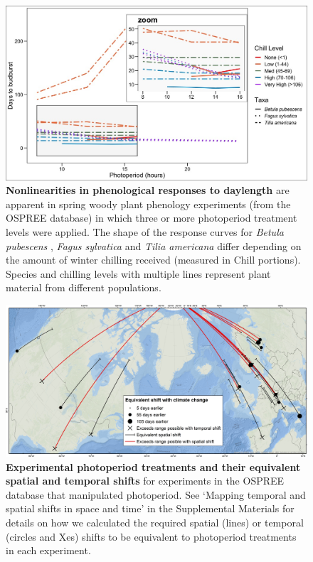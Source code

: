 \documentclass{article}
\begin{document}
\begin{figure}[p]
\includegraphics{..//..//analyses/photoperiod/figures/Photo_curv_FINAL.jpeg} 
\caption{\textbf{Nonlinearities in phenological responses to daylength} are apparent in spring woody plant phenology experiments (from the OSPREE database) in which three or more photoperiod treatment levels were applied. The shape of the response curves for \textit{Betula pubescens} \citep{Caffarra:2011b}, \textit{Fagus sylvatica} \citep{Heide:1993a} and \textit{Tilia americana} \citep{Ashby:1962aa} differ depending on the amount of winter chilling received (measured in Chill portions). Species and chilling levels with multiple lines represent plant material from different populations.}
 \label{fig:photocurve}
 \end{figure}


\begin{figure}[p]
\centering
\includegraphics{..//..//analyses/photoperiod/figures/ospree_photopmap_fromblake.jpg} 
\caption{\textbf{Experimental photoperiod treatments and their equivalent spatial and temporal shifts} for experiments in the OSPREE database that manipulated photoperiod. See `Mapping temporal and spatial shifts in space and time' in the Supplemental Materials for details on how we calculated the required spatial (lines) or temporal (circles and Xes) shifts to be equivalent to photoperiod treatments in each experiment.}
 \label{fig:photomap}
 \end{figure}
\end{document}
